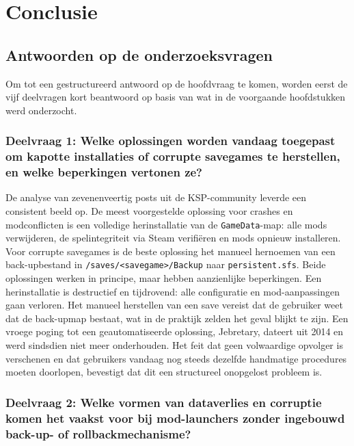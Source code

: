 
\chapter{Conclusie}%
\label{ch:conclusie}

\section{Antwoorden op de onderzoeksvragen}
\label{sec:concl-deelvragen}

Om tot een gestructureerd antwoord op de hoofdvraag te komen, worden eerst de vijf deelvragen kort beantwoord op basis van wat in de voorgaande hoofdstukken werd onderzocht.

\subsection*{Deelvraag 1: Welke oplossingen worden vandaag toegepast om kapotte installaties of corrupte savegames te herstellen, en welke beperkingen vertonen ze?}

De analyse van zevenenveertig posts uit de KSP-community leverde een consistent beeld op. De meest voorgestelde oplossing voor crashes en modconflicten is een volledige herinstallatie van de \texttt{GameData}-map: alle mods verwijderen, de spelintegriteit via Steam verifiëren en mods opnieuw installeren. Voor corrupte savegames is de beste oplossing het manueel hernoemen van een back-upbestand in \texttt{/saves/<savegame>/Backup} naar \texttt{persistent.sfs}. Beide oplossingen werken in principe, maar hebben aanzienlijke beperkingen. Een herinstallatie is destructief en tijdrovend: alle configuratie en mod-aanpassingen gaan verloren. Het manueel herstellen van een save vereist dat de gebruiker weet dat de back-upmap bestaat, wat in de praktijk zelden het geval blijkt te zijn. Een vroege poging tot een geautomatiseerde oplossing, Jebretary, dateert uit 2014 en werd sindsdien niet meer onderhouden. Het feit dat geen volwaardige opvolger is verschenen en dat gebruikers vandaag nog steeds dezelfde handmatige procedures moeten doorlopen, bevestigt dat dit een structureel onopgelost probleem is.

\subsection*{Deelvraag 2: Welke vormen van dataverlies en corruptie komen het vaakst voor bij mod-launchers zonder ingebouwd back-up- of rollbackmechanisme?}

